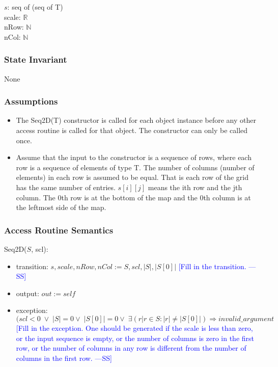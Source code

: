 \documentclass[12pt]{article}
\newcommand{\authornote}[3]{\textcolor{#1}{[#3 ---#2]}}
\newcommand{\authornote}[3]{}
\newcommand{\wss}[1]{\authornote{blue}{SS}{#1}}
\begin{document}
$s$: seq of (seq of T)\\
scale: $\mathbb{R}$\\
nRow: $\mathbb{N}$\\
nCol: $\mathbb{N}$

\subsubsection* {State Invariant}

None

\subsubsection* {Assumptions}

\begin{itemize}
\item The Seq2D(T) constructor is called for each object instance before any
other access routine is called for that object.  The constructor can only be
called once.
\item Assume that the input to the constructor is a sequence of rows, where each
  row is a sequence of elements of type T.  The number of columns (number of
  elements) in each row is assumed to be equal. That is each row
  of the grid has the same number of entries.  $s[i][j]$ means the ith row and
  the jth column.  The 0th row is at the bottom of the map and the 0th column
  is at the leftmost side of the map.
\end{itemize}

\subsubsection* {Access Routine Semantics}

Seq2D($S$, scl):
\begin{itemize}
\item transition: $s, scale, nRow, nCol := S, scl, |S|, |S[0]|$ \wss{Fill in the transition.}
\item output: $\mathit{out} := \mathit{self}$
\item exception: $(scl < 0 \; \lor \; |S| = 0 \lor \; |S[0]| = 0 \lor \; \exists(r | r \in S : |r| \neq |S[0]|) \Rightarrow invalid\_argument$ \\ \wss{Fill in the exception.  One should be generated if the
    scale is less than zero, or the input sequence is empty, or the number of
    columns is zero in the first row, or the number of columns in any row is
    different from the number of columns in the first row.}
\end{itemize}
\end{document}
